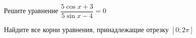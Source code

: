 \begin{ex}
	\begin{condition}
		\begin{enumcols}[label=\asbuk*)]
			\item Решите уравнение \( \dfrac{5\cos x + 3}{5\sin x -4} = 0 \)
			\item Найдите все корни уравнения, принадлежащие отрезку \( \left[0;2\pi\right] \)
		\end{enumcols}
	\end{condition}
\end{ex}